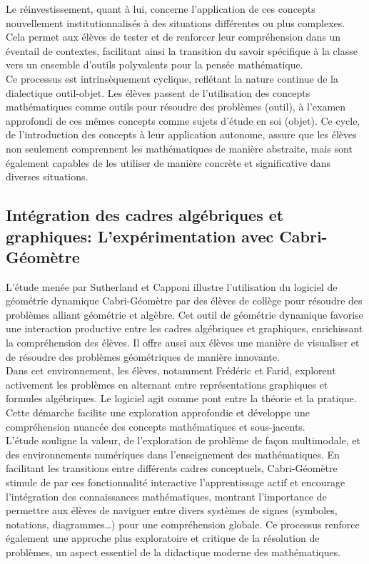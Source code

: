 Le réinvestissement,
quant à lui,
concerne l'application de ces concepts nouvellement institutionnalisés à des situations différentes ou plus complexes.
Cela permet aux élèves de tester et de renforcer leur compréhension dans un éventail de contextes,
facilitant ainsi la transition du savoir spécifique à la classe vers un ensemble d'outils polyvalents pour la pensée mathématique.\\

Ce processus est intrinsèquement cyclique,
reflétant la nature continue de la dialectique outil-objet.
Les élèves passent de l'utilisation des concepts mathématiques comme outils pour résoudre des problèmes (outil),
à l'examen approfondi de ces mêmes concepts comme sujets d'étude en soi (objet).
Ce cycle,
de l'introduction des concepts à leur application autonome,
assure que les élèves non seulement comprennent les mathématiques de manière abstraite,
mais sont également capables de les utiliser de manière concrète et significative dans diverses situations.

\subsection{Intégration des cadres algébriques et graphiques: L'expérimentation avec Cabri-Géomètre}

L'étude menée par Sutherland et Capponi illustre l'utilisation du logiciel de géométrie dynamique Cabri-Géomètre par des élèves de collège pour résoudre des problèmes alliant géométrie et algèbre.
Cet outil de géométrie dynamique favorise une interaction productive entre les cadres algébriques et graphiques,
enrichissant la compréhension des élèves.
Il offre aussi aux élèves une manière de visualiser et de résoudre des problèmes géométriques de manière innovante.\\

Dans cet environnement,
les élèves,
notamment Frédéric et Farid,
explorent activement les problèmes en alternant entre représentations graphiques et formules algébriques.
Le logiciel agit comme pont entre la théorie et la pratique.
Cette démarche facilite une exploration approfondie et développe une compréhension nuancée des concepts mathématiques et sous-jacents.\\

L'étude souligne la valeur,
de l'exploration de problème de façon multimodale,
et des environnements numériques dans l'enseignement des mathématiques.
En facilitant les transitions entre différents cadres conceptuels,
Cabri-Géomètre stimule de par ces fonctionnalité interactive l'apprentissage actif et encourage l'intégration des connaissances mathématiques,
montrant l'importance de permettre aux élèves de naviguer entre divers systèmes de signes (symboles, notations, diagrammes…) pour une compréhension globale.
Ce processus renforce également une approche plus exploratoire et critique de la résolution de problèmes,
un aspect essentiel de la didactique moderne des mathématiques.

